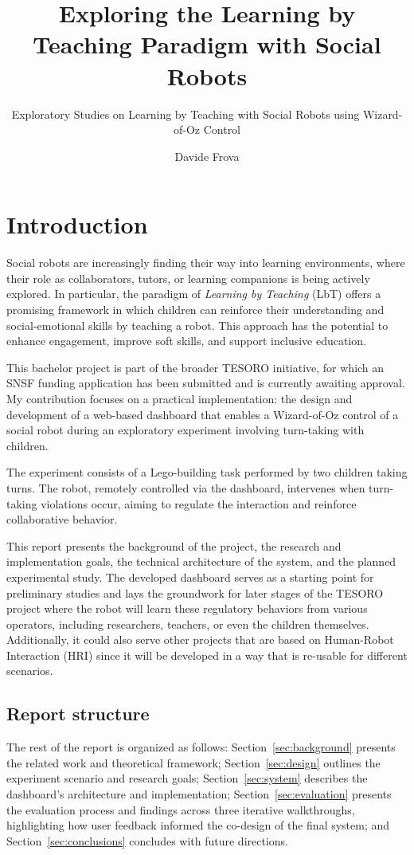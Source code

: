 \documentclass[a4paper]{usiinfbachelorproject}
\author{Davide Frova}
\title{\textbf{Exploring the Learning by Teaching Paradigm with Social Robots}}
\subtitle{Exploratory Studies on Learning by Teaching with Social Robots using Wizard-of-Oz Control}
\begin{document}
\maketitle
\tableofcontents\newpage

\section{\textbf{Introduction}}

Social robots are increasingly finding their way into learning environments, where their role as collaborators, tutors, or learning companions is being actively explored. In particular, the paradigm of \textit{Learning by Teaching} (LbT) offers a promising framework in which children can reinforce their understanding and social-emotional skills by teaching a robot. This approach has the potential to enhance engagement, improve soft skills, and support inclusive education.

This bachelor project is part of the broader TESORO initiative, for which an SNSF funding application has been submitted and is currently awaiting approval. My contribution focuses on a practical implementation: the design and development of a web-based dashboard that enables a Wizard-of-Oz control of a social robot during an exploratory experiment involving turn-taking with children.

The experiment consists of a Lego-building task performed by two children taking turns. The robot, remotely controlled via the dashboard, intervenes when turn-taking violations occur, aiming to regulate the interaction and reinforce collaborative behavior.

This report presents the background of the project, the research and implementation goals, the technical architecture of the system, and the planned experimental study.
The developed dashboard serves as a starting point for preliminary studies and lays the groundwork for later stages of the TESORO project where the robot will learn these regulatory behaviors from various operators, including researchers, teachers, or even the children themselves. Additionally, it could also serve other projects that are based on Human-Robot Interaction (HRI) since it will be developed in a way that is re-usable for different scenarios.

\subsection{\textbf{Report structure}}
The rest of the report is organized as follows: Section~\ref{sec:background} presents the related work and theoretical framework; Section~\ref{sec:design} outlines the experiment scenario and research goals; Section~\ref{sec:system} describes the dashboard's architecture and implementation; Section~\ref{sec:evaluation} presents the evaluation process and findings across three iterative walkthroughs, highlighting how user feedback informed the co-design of the final system; and Section~\ref{sec:conclusions} concludes with future directions.
\end{document}
